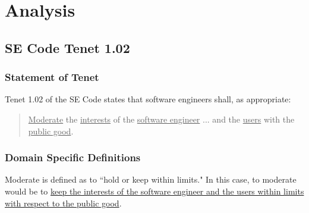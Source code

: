 \documentclass[12pt]{article}
\newcounter{subsubsubsection}[subsubsection]
\begin{document}
   

\section{Analysis}

\iffalse
\subsection{SE Code Tenet 1.02}

   \subsubsection{Statement of Tenet}
      Tenet 1.02 of the SE Code states that software engineers shall, as appropriate:
      
      \begin{quote}
		\uline{Moderate} the \uline{interests} of the \uline{software engineer} ... and the \uline{users} with the \uline{public good}.\cite{codeOfEthics}
      \end{quote}
   
   \subsubsection{Domain Specific Definitions}
   
      Moderate is defined as to ``hold or keep within limits."\cite{audioenglishDefineModerate} In this case, to moderate would be to \uline{keep the interests of the software engineer and the users within limits with respect to the public good}.
      
\end{document}

